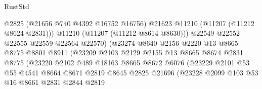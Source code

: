 \begin{lexlean}{RustStd}
\begin{coremodule}
                                      @2825
                                      (@21656 @740 @4392 @16752 @16756)
                                      @21623
                                      @11210
                                      (@11207 (@11212 @8624 @2831)))
                                    @11210
                                    (@11207 (@11212 @8614 @8630)))
                                  @22549
                                  @22552
                                  @22555
                                  @22559
                                  @22564
                                  @22570)
                                (@23274
                                  @8640
                                  @2156
                                  @2220
                                  @13
                                  @8665
                                  @8775
                                  @8801
                                  @8911
                                  (@23209
                                    @2103
                                    @2129
                                    @2155
                                    @13
                                    @8665
                                    @8674
                                    @2831
                                    @8775
                                    (@23220
                                      @2102
                                      @489
                                      @18163
                                      @8665
                                      @8672
                                      @6076
                                      (@23229
                                        @2101
                                        @53
                                        @55
                                        @4541
                                        @8664
                                        @8671
                                        @2819
                                        @8645
                                        @2825
                                        @21696
                                        (@23228
                                          @2099
                                          @103
                                          @53
                                          @16
                                          @8661
                                          @2831
                                          @2844
                                          @2819

\end{coremodule}
\end{lexlean}
